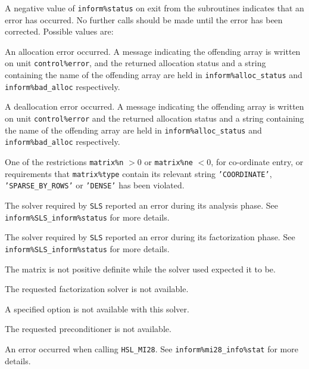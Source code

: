 \documentclass{galahad}
\begin{document}

\galerrors
A negative value of {\tt inform\%status} on exit from the subroutines
indicates that an error has occurred. No further calls should be made
until the error has been corrected. Possible values are:

\begin{description}

\itt{\galerrallocate} An allocation error occurred. A message indicating
the offending
array is written on unit {\tt control\%error}, and the returned allocation
status and a string containing the name of the offending array
are held in {\tt inform\%alloc\_\-status}
and {\tt inform\%bad\_alloc} respectively.

\itt{\galerrdeallocate} A deallocation error occurred.
A message indicating the offending
array is written on unit {\tt control\%error} and the returned allocation
status and a string containing the name of the offending array
are held in {\tt inform\%alloc\_\-status}
and {\tt inform\%bad\_alloc} respectively.

\itt{\galerrrestrictions} One of the restrictions
 {\tt matrix\%n} $> 0$ or
 {\tt matrix\%ne} $< 0$, for co-ordinate entry,
  or requirements that {\tt matrix\%type}
  contain its relevant string
{\tt 'COORDINATE'}, {\tt 'SPARSE\_BY\_ROWS'} or   {\tt 'DENSE'}
  has been violated.

\itt{\galerranalysis} The solver required by {\tt SLS} reported an
  error during its analysis phase. 
  See {\tt inform\%SLS\_inform\%status} for more details.

\itt{\galerrfactorization} The solver required by {\tt SLS} reported an
  error during its factorization phase. 
  See {\tt inform\%SLS\_inform\%status} for more details.

\itt{\galerrinertia} The matrix is not positive definite while the solver
  used expected it to be.

\itt{\galunknownsolver} The requested factorization solver is not available.

\itt{\galerrunavailable} A specified option is not available with this solver.

\itt{\galerrunknownprecond} The requested preconditioner is not available.
     
\itt{\galerrmitwentyeight} An error occurred when calling {\tt HSL\_MI28}. See
  {\tt inform\%mi28\_info\%stat} for more details.


\end{description}
\end{document}
